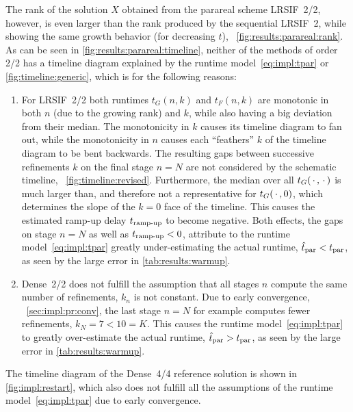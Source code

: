 The rank of the solution $X$ obtained from the parareal scheme \ac{LRSIF}~2/2, however,
is even larger than the rank produced by the sequential \ac{LRSIF}~2,
while showing the same growth behavior (for decreasing $t$),
\cf~\autoref{fig:results:parareal:rank}.
As can be seen in \autoref{fig:results:parareal:timeline},
neither of the methods of order 2/2 has a timeline diagram explained by the runtime model~\eqref{eq:impl:tpar} or \autoref{fig:timeline:generic},
which is for the following reasons:
\begin{enumerate}[resume]
  \item
    For \ac{LRSIF}~2/2 both runtimes $t_G(n, k)$ and $t_F(n, k)$ are monotonic in both $n$ (due to the growing rank) and $k$,
    while also having a big deviation from their median.
    The monotonicity in $k$ causes its timeline diagram to fan out,
    while the monotonicity in $n$ causes each \enquote{feathers} $k$ of the timeline diagram to be bent backwards.
    The resulting gaps between successive refinements $k$ on the final stage $n=N$ are not considered
    by the schematic timeline, \cf~\autoref{fig:timeline:revised}.
    Furthermore, the median over all $t_G(\optional{},\optional{})$ is much larger than,
    and therefore not a representative for $t_G(\optional{}, 0)$,
    which determines the slope of the $k=0$ face of the timeline.
    This causes the estimated ramp-up delay $t_\text{ramp-up}$ to become negative.
    Both effects, the gaps on stage $n=N$ as well as $t_\text{ramp-up}<0$,
    attribute to the runtime model~\eqref{eq:impl:tpar} greatly under-estimating the actual runtime,
    $\hat t_\text{par} < t_\text{par}$,
    as seen by the large error in \autoref{tab:results:warmup}.
  \item
    Dense~2/2 does not fulfill the assumption that all stages $n$ compute the same number of refinements,
    \ie $k_n$ is not constant.
    Due to early convergence, \cf~\autoref{sec:impl:pr:conv},
    the last stage $n=N$ for example computes fewer refinements, $k_N = 7 < 10 = K$.
    This causes the runtime model~\eqref{eq:impl:tpar} to greatly over-estimate the actual runtime,
    $\hat t_\text{par} > t_\text{par}$,
    as seen by the large error in \autoref{tab:results:warmup}.
\end{enumerate}
The timeline diagram of the Dense~4/4 reference solution is shown in \autoref{fig:impl:restart},
which also does not fulfill all the assumptions of the runtime model~\eqref{eq:impl:tpar} due to early convergence.


